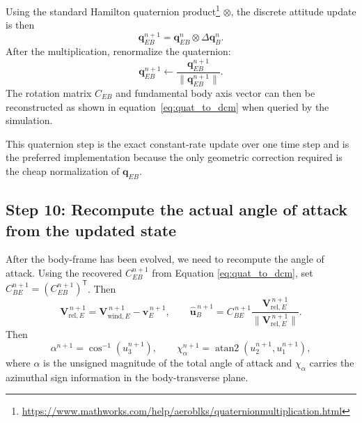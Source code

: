 
Using the standard Hamilton quaternion product\footnote{\url{https://www.mathworks.com/help/aeroblks/quaternionmultiplication.html}} \(\otimes\), the discrete attitude update is then
\begin{equation}
\mathbf q_{EB}^{n+1}
=
\mathbf q_{EB}^{n}\otimes \Delta\mathbf q_B^n. \label{eq:quat_update}
\end{equation}
After the multiplication, renormalize the quaternion:
\begin{equation}
\mathbf q_{EB}^{n+1}
\leftarrow
\frac{\mathbf q_{EB}^{n+1}}{\|\mathbf q_{EB}^{n+1}\|}.
\end{equation}
The rotation matrix $C_{EB}$ and fundamental body axis vector can then be reconstructed as shown in equation~\ref{eq:quat_to_dcm} when queried by the simulation.

This quaternion step is the exact constant-rate update over one time step and is the preferred implementation because the only geometric correction required is the cheap normalization of \(\mathbf q_{EB}\).


\subsection{Step 10: Recompute the actual angle of attack from the updated state}

After the body-frame has been evolved, we need to recompute the angle of attack. Using the recovered \(C_{EB}^{n+1}\) from Equation \eqref{eq:quat_to_dcm}, set \(C_{BE}^{n+1}=\left(C_{EB}^{n+1}\right)^{\mathsf T}\). Then
\begin{equation}
\mathbf V_{\mathrm{rel},E}^{\,n+1}
=
\mathbf V_{\mathrm{wind},E}^{\,n+1}
-
\mathbf v_E^{\,n+1},
\qquad
\hat{\mathbf u}_B^{\,n+1}
=
C_{BE}^{\,n+1}
\frac{\mathbf V_{\mathrm{rel},E}^{\,n+1}}
{\|\mathbf V_{\mathrm{rel},E}^{\,n+1}\|}.
\end{equation}
Then
\begin{equation}
\alpha^{n+1}
=
\cos^{-1}\!\left(u_3^{n+1}\right),
\qquad
\chi_\alpha^{n+1}
=
\operatorname{atan2}\!\left(u_2^{n+1},u_1^{n+1}\right),
\end{equation}
where \(\alpha\) is the unsigned magnitude of the total angle of attack and \(\chi_\alpha\) carries the azimuthal sign information in the body-transverse plane. 

